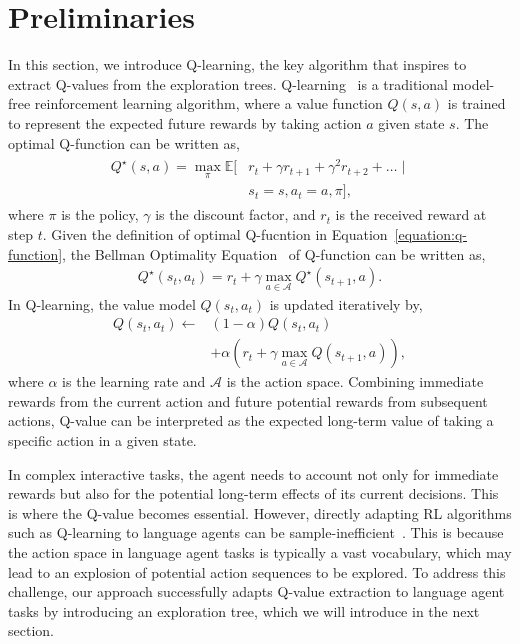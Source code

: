 \section{Preliminaries}
In this section, we introduce Q-learning, the key algorithm that inspires {\ours} to extract Q-values from the exploration trees. 
Q-learning~\citep{qlearning} is a traditional model-free reinforcement learning algorithm, where a value function $Q(s,a)$ is trained to represent the expected future rewards by taking action $a$ given state $s$. The optimal Q-function can be written as,
\begin{align}
\begin{aligned}
    \label{equation:q-function}
    Q^{\star}(s,a) = \max_{\pi} \mathbb{E}[&r_t + \gamma r_{t+1} + \gamma^2 r_{t+2} + \dots \mid \\ & s_t = s, a_t = a, \pi ],
\end{aligned}
\end{align}
where $\pi$ is the policy, $\gamma$ is the discount factor, and $r_t$ is the received reward at step $t$. Given the definition of optimal Q-fucntion in Equation~\ref{equation:q-function}, the Bellman Optimality Equation~\citep{bellman2015applied} of Q-function can be written as,
\begin{equation}
\begin{aligned}
    Q^{\star}(s_t, a_t) = r_t + \gamma  \max_{a\in\mathcal{A}} Q^{\star}(s_{t+1}, a).
\end{aligned}
\end{equation}
In Q-learning, the value model $Q(s_t,a_t)$ is updated iteratively by,
\begin{align}
    Q(s_t, a_t) \leftarrow &(1-\alpha)Q(s_t, a_t) \\
     & + \alpha ( r_t + \gamma \max_{a\in\mathcal{A}} Q(s_{t+1}, a)),
 \end{align}
where $\alpha$ is the learning rate and $\mathcal{A}$ is the action space. Combining immediate rewards from the current action and future potential rewards from subsequent actions, Q-value can be interpreted as the expected long-term value of taking a specific action in a given state.


 In complex interactive tasks, the agent needs to account not only for immediate rewards but also for the potential long-term effects of its current decisions. This is where the Q-value becomes essential. However, directly adapting RL algorithms such as Q-learning to language agents can be sample-inefficient~\citep{NEURIPS2018_inefficentQ}. This is because the action space in language agent tasks is typically a vast vocabulary, which may lead to an explosion of potential action sequences to be explored. To address this challenge, our approach successfully adapts Q-value extraction to language agent tasks by introducing an exploration tree, which we will introduce in the next section.





